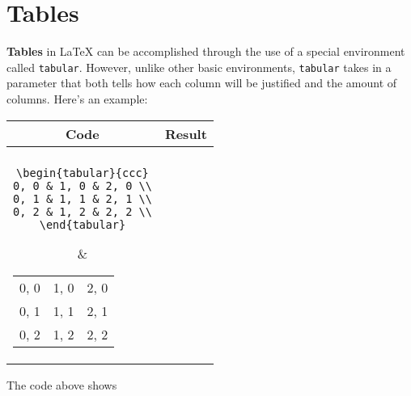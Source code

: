 \section{Tables}
\textbf{Tables} in \LaTeX{} can be accomplished through the use of a special environment called \texttt{tabular}. However, unlike other basic environments, \texttt{tabular} takes in a parameter that both tells how each column will be justified and the amount of columns. Here's an example:\\

\begin{center}
\begin{tabular}{cc}

Code & Result\\
\hline\\

\parbox{4cm} {
    \texttt{\textbackslash begin\{tabular\}\{ccc\}\\
    0, 0 \& 1, 0 \& 2, 0 \textbackslash \textbackslash \\
    0, 1 \& 1, 1 \& 2, 1 \textbackslash \textbackslash \\
    0, 2 \& 1, 2 \& 2, 2 \textbackslash \textbackslash \\
    \textbackslash end\{tabular\}\\
    }
}

&

\begin{tabular}{ccc}
    0, 0 & 1, 0 & 2, 0 \\
    0, 1 & 1, 1 & 2, 1 \\
    0, 2 & 1, 2 & 2, 2 \\
\end{tabular}

\end{tabular}
\end{center}

The code above shows
